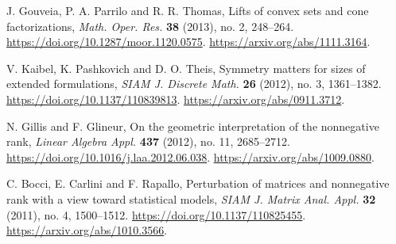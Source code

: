 J. Gouveia, P. A. Parrilo and R. R. Thomas,
Lifts of convex sets and cone factorizations,
\emph{Math. Oper. Res.} \textbf{38} (2013), no. 2, 248--264.
\url{https://doi.org/10.1287/moor.1120.0575}.
\url{https://arxiv.org/abs/1111.3164}.

V. Kaibel, K. Pashkovich and D. O. Theis,
Symmetry matters for sizes of extended formulations,
\emph{SIAM J. Discrete Math.} \textbf{26} (2012), no. 3, 1361--1382.
\url{https://doi.org/10.1137/110839813}.
\url{https://arxiv.org/abs/0911.3712}.

N. Gillis and F. Glineur,
On the geometric interpretation of the nonnegative rank,
\emph{Linear Algebra Appl.} \textbf{437} (2012), no. 11, 2685--2712.
\url{https://doi.org/10.1016/j.laa.2012.06.038}.
\url{https://arxiv.org/abs/1009.0880}.

C. Bocci, E. Carlini and F. Rapallo,
Perturbation of matrices and nonnegative rank with a view toward statistical models,
\emph{SIAM J. Matrix Anal. Appl.} \textbf{32} (2011), no. 4, 1500--1512.
\url{https://doi.org/10.1137/110825455}.
\url{https://arxiv.org/abs/1010.3566}.

